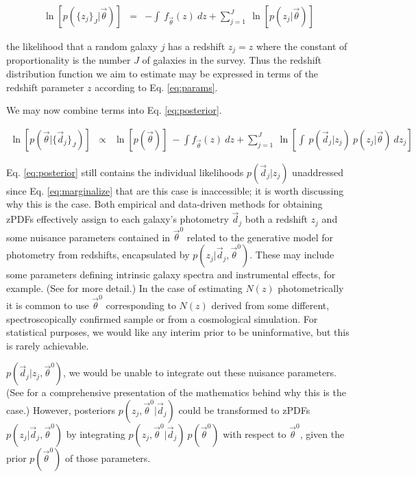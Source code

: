 \documentclass[preprint]{aastex}
\begin{document}
\begin{eqnarray}
\label{eq:indie}
\ln[p(\{z_{j}\}_{J}|\vec{\theta})] &=& -\int\ f_{\vec{\theta}}(z)\ dz +  
\sum_{j=1}^{J}\ \ln[p(z_{j}|\vec{\theta})]
\end{eqnarray}

the likelihood that a random galaxy $j$ has a redshift $z_{j}=z$ where the 
constant of proportionality is the number $J$ of galaxies in the survey.  Thus 
the redshift distribution function we aim to estimate may be expressed in terms 
of the redshift parameter $z$ according to Eq. \ref{eq:params}.  

We may now combine terms into Eq. \ref{eq:posterior}.

\begin{eqnarray}
\label{eq:posterior}
\ln[p(\vec{\theta}|\{\vec{d}_{j}\}_{J})] &\propto& \ln[p(\vec{\theta})]\ -\int 
f_{\vec{\theta}}(z)\ dz + \sum_{j=1}^{J}\ \ln\left[\int\ p(\vec{d}_{j}|z_{j})\ 
p(z_{j}|\vec{\theta})\ dz_{j}\right]
\end{eqnarray}

Eq. \ref{eq:posterior} still contains the individual likelihoods 
$p(\vec{d}_{j}|z_{j})$ unaddressed since Eq. \ref{eq:marginalize} that are this 
case is inaccessible; it is worth discussing why this is the case.  Both 
empirical and data-driven methods for obtaining zPDFs effectively assign to 
each galaxy's photometry $\vec{d}_{j}$ both a redshift $z_{j}$ and some 
nuisance parameters contained in $\vec{\theta}^{0}$ related to the generative 
model for photometry from redshifts, encapsulated by 
$p(z_{j}|\vec{d}_{j},\vec{\theta}^{0})$.  These may include some parameters 
defining intrinsic galaxy spectra and instrumental effects, for example. (See 
\citet{ben98} for more detail.)  In the case of estimating $N(z)$ 
photometrically it is common to use $\vec{\theta}^{0}$ corresponding to $N(z)$ 
derived from some different, spectroscopically confirmed sample or from a 
cosmological simulation.  For statistical purposes, we would like any interim 
prior to be uninformative, but this is rarely achievable.

$p(\vec{d}_{j}|z_{j},\vec{\theta}^{0})$, we would be unable to integrate out 
these nuisance parameters.  (See \citet{hog12} for a comprehensive presentation 
of the mathematics behind why this is the case.)  However, posteriors 
$p(z_{j},\vec{\theta}^{0}|\vec{d}_{j})$ could be transformed to zPDFs 
$p(z_{j}|\vec{d}_{j},\vec{\theta}^{0})$ by integrating 
$p(z_{j},\vec{\theta}^{0}|\vec{d}_{j})\ p(\vec{\theta}^{0})$ with respect to 
$\vec{\theta}^{0}$, given the prior  $p(\vec{\theta}^{0})$ of those parameters. 
 
\end{document}
